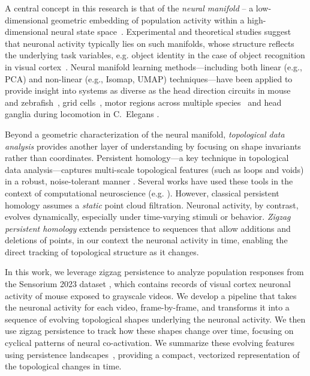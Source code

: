 \documentclass[11pt]{article}
\begin{document}
A central concept in this research is that of the \emph{neural manifold} -- a low-dimensional geometric embedding of population activity within a high-dimensional neural state space~\cite{gallego2017neural}.
Experimental and theoretical studies suggest that neuronal activity typically lies on such manifolds, whose structure reflects the underlying task variables, e.g. object identity in the case of object recognition in visual cortex~\cite{dicarloHowDoesBrain2012,chungNeuralPopulationGeometry2021,perichNeuralManifoldView2025}.
Neural manifold learning methods---including both linear (e.g., PCA) and non-linear (e.g., Isomap, UMAP) techniques---have been applied to provide insight into systems as diverse as the head direction circuits in  mouse~\cite{chaudhuri2019intrinsic} and zebrafish~\cite{petruccoNeuralDynamicsArchitecture2023}, grid cells~\cite{gardnerToroidalTopologyPopulation2022}, motor regions across multiple species~\cite{gao2017theory,fortunatoNonlinearManifoldsUnderlie2024} and head ganglia during locomotion in C.\ Elegans \cite{brennanQuantitativeModelConserved2019}.


Beyond a geometric characterization of the neural manifold, \emph{topological data analysis} provides another layer of understanding by focusing on shape invariants rather than coordinates.
Persistent homology---a key technique in topological data analysis---captures multi-scale topological features (such as loops and voids) in a robust, noise-tolerant manner \cite{edelsbrunner2000topological,carlsson2009topology}.
Several works have used these tools in the context of computational neuroscience (e.g. \cite{giusti2015clique,riemanncliques}).
However, classical persistent homology assumes a \textit{static} point cloud filtration.
Neuronal activity, by contrast, evolves dynamically, especially under time-varying stimuli or behavior. \emph{Zigzag persistent homology} \cite{carlsson2009zigzag} extends persistence to sequences that allow additions and deletions of points, in our context the neuronal activity in time, enabling the direct tracking of topological structure as it changes. 

In this work, we leverage zigzag persistence to analyze population responses from the Sensorium 2023 dataset \cite{sensorium2023}, which contains records of visual cortex neuronal activity of mouse exposed to grayscale videos. 
We develop a pipeline that takes the neuronal activity for each video, frame-by-frame, and transforms it into a sequence of evolving topological shapes underlying the neuronal activity. We then use zigzag persistence to track how these shapes change over time, focusing on cyclical patterns of neural co-activation. We summarize these evolving features using persistence landscapes~\cite{bubenik2015statistical}, providing a compact, vectorized representation of the topological changes in time.
\end{document}
